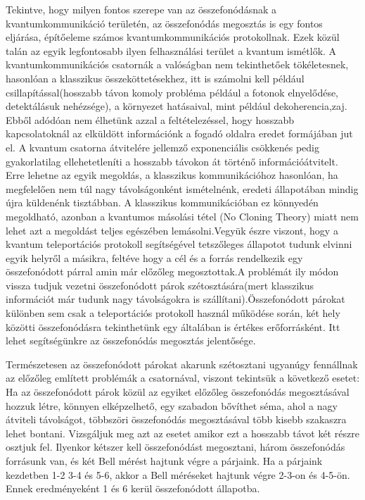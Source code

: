 Tekintve, hogy milyen fontos szerepe van az összefonódásnak a kvantumkommunikáció területén, az összefonódás megosztás is egy fontos eljárása, építőeleme számos kvantumkommunikációs protokollnak. Ezek közül talán az egyik legfontosabb ilyen felhasználási terület a kvantum ismétlők. A kvantumkommunikációs csatornák a valóságban nem tekinthetőek tökéletesnek, hasonlóan a klasszikus összeköttetésekhez, itt is számolni kell például csillapítással(hosszabb távon komoly probléma például a fotonok elnyelődése, detektálásuk nehézsége), a környezet hatásaival, mint például dekoherencia,zaj. Ebből adódóan nem élhetünk azzal a feltételezéssel, hogy hosszabb kapcsolatoknál az elküldött információnk a fogadó oldalra eredet formájában jut el. A kvantum csatorna átvitelére jellemző exponenciális csökkenés pedig gyakorlatilag ellehetetleníti a hosszabb távokon át történő információátvitelt. Erre lehetne az egyik megoldás, a klasszikus kommunikációhoz hasonlóan, ha megfelelően nem túl nagy távolságonként ismételnénk, eredeti állapotában mindig újra küldenénk tisztábban. A klasszikus kommunikációban ez könnyedén megoldható, azonban a kvantumos másolási tétel (No Cloning Theory) miatt nem lehet azt a megoldást teljes egészében lemásolni.Vegyük észre viszont, hogy a kvantum teleportációs protokoll segítségével tetszőleges állapotot tudunk elvinni egyik helyről a másikra, feltéve hogy a cél és a forrás rendelkezik egy összefonódott párral amin már előzőleg megosztottak.A problémát ily módon vissza tudjuk vezetni összefonódott párok szétosztására(mert klasszikus információt már tudunk nagy távolságokra is szállítani).Összefonódott párokat különben sem csak a teleportációs protokoll használ működése során, két hely közötti összefonódásra tekinthetünk egy általában is értékes erőforrásként. Itt lehet segítségünkre az összefonódás megosztás jelentősége.  
 
Természetesen az összefonódott párokat akarunk szétosztani ugyanúgy fennállnak az előzőleg említett problémák a csatornával, viszont tekintsük a következő esetet\cite{goebel2008multistage}: Ha az összefonódott párok közül az egyiket előzőleg összefonódás megosztásával hozzuk létre, könnyen elképzelhető, egy szabadon bővíthet séma, ahol a nagy átviteli távolságot, többszöri összefonódás megosztásával több kisebb szakaszra lehet bontani.
Vizsgáljuk meg azt az esetet amikor ezt a hosszabb távot két részre osztjuk fel. Ilyenkor kétszer kell összefonódást megosztani, három összefonódás forrásunk van, és két Bell mérést hajtunk végre a párjaink. Ha a párjaink kezdetben 1-2 3-4 és 5-6, akkor a Bell méréseket hajtunk végre 2-3-on és 4-5-ön. Ennek eredményeként 1 és 6 kerül összefonódott állapotba.
\\

